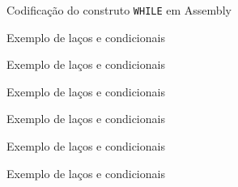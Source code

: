 \begin{frame}[fragile]{Codificação do construto {\tt WHILE} em Assembly}
\end{frame}

\begin{frame}[fragile]{Exemplo de laços e condicionais}
\end{frame}

\begin{frame}[fragile]{Exemplo de laços e condicionais}
\end{frame}

\begin{frame}[fragile]{Exemplo de laços e condicionais}
\end{frame}

\begin{frame}[fragile]{Exemplo de laços e condicionais}
\end{frame}
\begin{frame}[fragile]{Exemplo de laços e condicionais}
\end{frame}
\begin{frame}[fragile]{Exemplo de laços e condicionais}
\end{frame}
